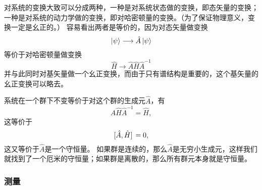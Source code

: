 \documentclass[hyperref, UTF8, a4paper]{ctexart}
\begin{document}
对系统的变换大致可以分成两种，一种是对系统状态做的变换，即态矢量的变换；一种是对系统的动力学做的变换，即对哈密顿量的变换。（为了保证物理意义，变换一定是幺正的。）
容易看出两者是等价的，因为对态矢量做变换
\[
    \ket{\psi} \longrightarrow \hat{A} \ket{\psi}
\]
等价于对哈密顿量做变换
\[
    \hat{H} \longrightarrow \hat{A} \hat{H} \hat{A}^{-1}
\]
并与此同时对基矢量做一个幺正变换，而由于只有谱结构是重要的，这个基矢量的幺正变换可以略去。

系统在一个群下不变等价于对这个群的生成元$\hat{A}$，有
\[
    \hat{A} \hat{H} \hat{A}^{-1} = \hat{H},
\]
这等价于
\[
    \comm*{\hat{A}}{\hat{H}} = 0,
\]
这又等价于$\hat{A}$是一个守恒量。
如果群是连续的，那么$\hat{A}$是无穷小生成元，这样我们就找到了一个厄米的守恒量；如果群是离散的，那么所有群元本身就是守恒量。

\subsubsection{测量}\label{sec:measure}
\end{document}
